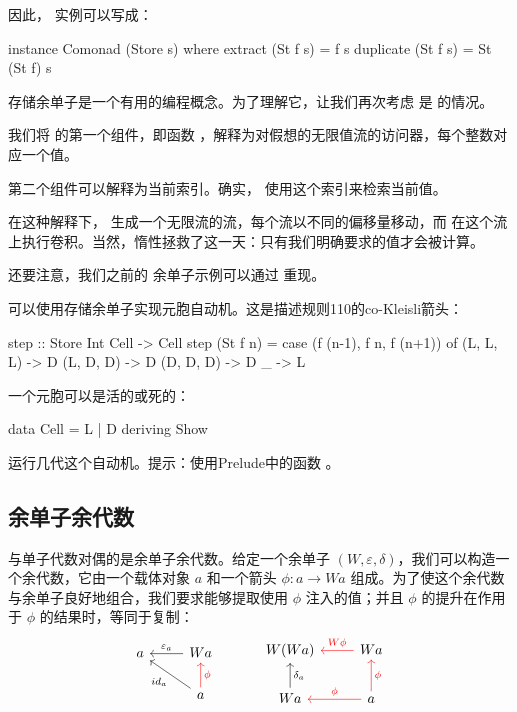 \documentclass[DaoFP]{subfiles}
\begin{document}
因此， 实例可以写成：
\begin{haskell}
instance Comonad (Store s) where
  extract (St f s) = f s
  duplicate (St f s) = St (St f) s
\end{haskell}

存储余单子是一个有用的编程概念。为了理解它，让我们再次考虑  是  的情况。

我们将  的第一个组件，即函数 ，解释为对假想的无限值流的访问器，每个整数对应一个值。

第二个组件可以解释为当前索引。确实， 使用这个索引来检索当前值。

在这种解释下， 生成一个无限流的流，每个流以不同的偏移量移动，而  在这个流上执行卷积。当然，惰性拯救了这一天：只有我们明确要求的值才会被计算。

还要注意，我们之前的  余单子示例可以通过  重现。

\begin{exercise}
可以使用存储余单子实现元胞自动机。这是描述规则110的co-Kleisli箭头：
\begin{haskell}
step :: Store Int Cell -> Cell
step (St f n) = 
    case (f (n-1), f n, f (n+1)) of
    (L, L, L) -> D
    (L, D, D) -> D
    (D, D, D) -> D
    _ -> L
\end{haskell}
一个元胞可以是活的或死的：
\begin{haskell}
data Cell = L | D 
    deriving Show
\end{haskell}
运行几代这个自动机。提示：使用Prelude中的函数 。
\end{exercise}

\subsection{余单子余代数}

与单子代数对偶的是余单子余代数。给定一个余单子 $(W, \varepsilon, \delta)$，我们可以构造一个余代数，它由一个载体对象 $a$ 和一个箭头 $\phi \colon a \to W a$ 组成。为了使这个余代数与余单子良好地组合，我们要求能够提取使用 $\phi$ 注入的值；并且 $\phi$ 的提升在作用于 $\phi$ 的结果时，等同于复制：
\[
 \begin{tikzcd}
 a
 & W a
 \arrow[l, "\varepsilon_a"']
 \\
 & a
 \arrow[ul, "id_a"]
\arrow[u, red, "\phi"']
 \end{tikzcd}
  \hspace{30pt}
 \begin{tikzcd}
W(W a) 
&W a
\arrow[l, red, "W \phi "']
\\
W a
\arrow[u, "\delta_a"']
& a
\arrow[l, red, "\phi"']
\arrow[u, red, "\phi"']
 \end{tikzcd}
\]
\end{document}
